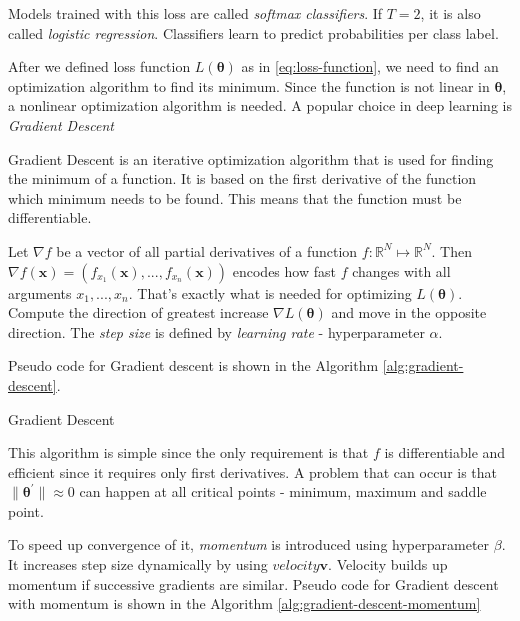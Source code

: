 Models trained with this loss are called \textit{softmax classifiers}. If $T = 2$, it is also called \textit{logistic regression}. Classifiers learn to predict probabilities per class label.

After we defined loss function $L(\pmb \theta)$  as in \ref{eq:loss-function}, we need to find an optimization algorithm to find its minimum. Since the function is not linear in $\pmb \theta$, a nonlinear optimization algorithm is needed. A popular choice in deep learning is \textit{Gradient Descent}

Gradient Descent is an iterative optimization algorithm that is used for finding the minimum of a function. It is based on the first derivative of the function which minimum needs to be found. This means that the function must be differentiable. 

Let $\nabla f$ be a vector of all partial derivatives of a function $f: \mathbb{R}^N \mapsto \mathbb{R}^N$. Then $\nabla f(\pmb x) = (f_{x_1}(\pmb x), ..., f_{x_n}(\pmb x))$  encodes how fast $f$ changes with all arguments $x_1, ..., x_n$. That's exactly what is needed for optimizing $L(\pmb \theta)$. Compute the direction of greatest increase $\nabla L(\pmb \theta)$ and move in the opposite direction. The \textit{step size} is defined by \textit{learning rate} - hyperparameter $\alpha$.  

Pseudo code for Gradient descent is shown in the Algorithm \ref{alg:gradient-descent}.

\begin{algorithm}[htb]
\caption{Gradient Descent}
\label{alg:gradient-descent}


\end{algorithm}

This algorithm is simple since the only requirement is that $f$ is differentiable and efficient since it requires only first derivatives. A problem that can occur is that $\| \pmb \theta^{'}\|  \approx 0$ can happen at all critical points - minimum, maximum and saddle point.

To speed up convergence of it, \textit{momentum} is introduced using hyperparameter $\beta$. It increases step size dynamically by using $velocity \pmb v$. Velocity builds up momentum if successive gradients are similar. Pseudo code for Gradient descent with momentum is shown in the Algorithm \ref{alg:gradient-descent-momentum}

